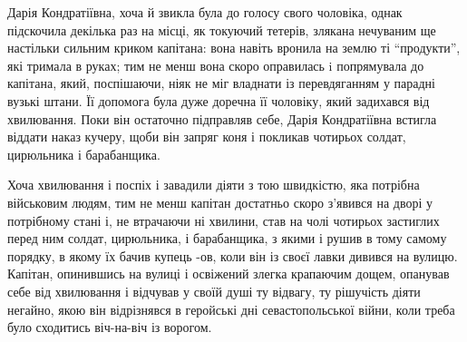 \documentclass[a4paper,20pt]{report}
\begin{document}
Дарія Кондратіївна, хоча й звикла була до голосу свого чоловіка, однак
підскочила декілька раз на місці, як токуючий тетерів, злякана нечуваним ще
настільки сильним криком капітана: вона навіть вронила на землю ті
``продукти'', які тримала в руках; тим не менш вона скоро оправилась i
попрямувала до капітана, який, поспішаючи, ніяк не міг владнати із
перевдяганням у парадні вузькі штани. Її допомога була дуже доречна її
чоловіку, який задихався від хвилювання. Поки він остаточно підправляв себе,
Дарія Кондратіївна встигла віддати наказ кучеру, щоби він запряг коня і
покликав чотирьох солдат, цирюльника і барабанщика.

Хоча хвилювання і поспіх і завадили діяти з тою швидкістю, яка 
потрібна військовим людям, тим не менш
капітан достатньо скоро з'явився на дворі у потрібному стані і, не втрачаючи ні
хвилини, став на чолі чотирьох застиглих перед ним солдат, цирюльника, і
барабанщика, з якими і рушив в тому самому порядку, в якому їх бачив купець
-ов, коли він із своєї лавки дивився на вулицю. Капітан, опинившись на вулиці і
освіжений злегка крапаючим дощем, опанував себе від хвилювання і відчував у
своїй душі ту відвагу, ту рішучість діяти негайно, якою він відрізнявся в
геройські дні севастопольської війни, коли треба було сходитись віч-на-віч із
ворогом.


	



\end{document}
